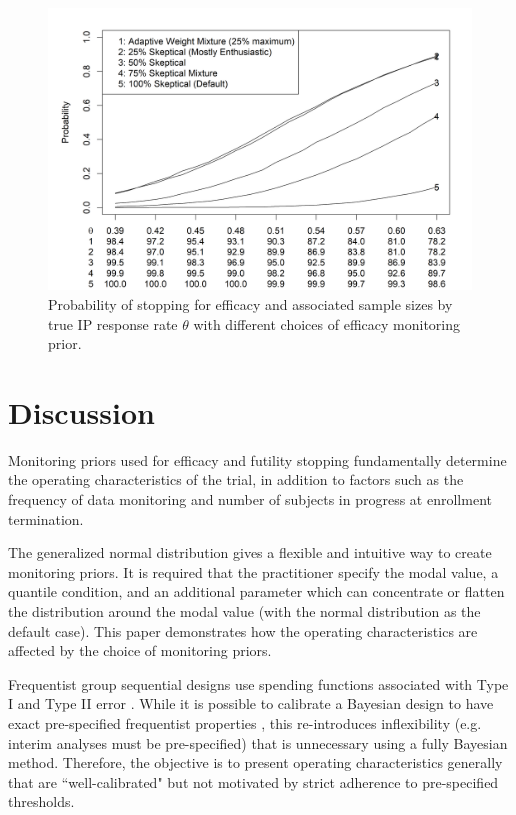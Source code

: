 \documentclass[12pt]{article}
\begin{document}
\newpage
\begin{figure}\begin{center}
    \centering\includegraphics[width=7in]{./FIGURES/figure6.png}
    \caption{Probability of stopping for efficacy and associated sample sizes by true IP response rate $\theta$ with different choices of efficacy monitoring prior.}
\label{fig:ex2varyomega}
 \end{center}\end{figure}
\newpage

\section{Discussion}
 Monitoring priors used for efficacy and futility stopping fundamentally determine the operating characteristics of the trial, in addition to factors such as the frequency of data monitoring and number of subjects in progress at enrollment termination.

The generalized normal distribution gives a flexible and intuitive way to create monitoring priors. It is required that the practitioner specify the modal value, a quantile condition, and an additional parameter which can concentrate or flatten the distribution around the modal value (with the normal distribution as the default case). This paper demonstrates how the operating characteristics are affected by the choice of monitoring priors.

Frequentist group sequential designs use spending functions associated with Type I and Type II error \citep{Pocock1977,OBrien1979}. While it is possible to calibrate a Bayesian design to have exact pre-specified frequentist properties \citep{Kopp-Schneider2019}, this re-introduces inflexibility (e.g. interim analyses must be pre-specified) that is unnecessary using a fully Bayesian method. Therefore, the objective is to present operating characteristics generally that are ``well-calibrated" \citep{Grieve2016} but not motivated by strict adherence to pre-specified thresholds.
 
\end{document}
